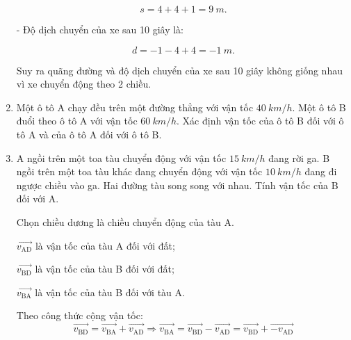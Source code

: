 \begin{enumerate}[label=\bfseries Câu \arabic*:]
{\begin{enumerate}[label=\alph*)]
			$$s = 4 + 4 + 1 = \SI{9}{m}.$$
			
			- Độ dịch chuyển của xe sau 10 giây là:
			
			$$d = - 1 - 4 + 4 = - \SI{1}{m}.$$
			
			Suy ra quãng đường và độ dịch chuyển của xe sau 10 giây không giống nhau vì xe chuyển động theo 2 chiều.
			
		\end{enumerate}
		
	}
			\item {}

{Một ô tô A chạy đều trên một đường thẳng với vận tốc $\SI{40}{km/h}$. Một ô tô B đuổi theo ô tô A với vận tốc $\SI{60}{km/h}$. Xác định vận tốc của ô tô B đối với ô tô A và của ô tô A đối với ô tô B.}
\item {}


{A ngồi trên một toa tàu chuyển động với vận tốc $\SI{15}{km/h}$ đang rời ga. B ngồi trên một toa tàu khác đang chuyển động với vận tốc $\SI{10}{km/h}$ đang đi ngược chiều vào ga. Hai đường tàu song song với nhau. Tính vận tốc của B đối với A.
}
\hideall
{Chọn chiều dương là chiều chuyển động của tàu A.
	
	$\overrightarrow{v_\text{AD}}$ là vận tốc của tàu A đối với đất;
	
	$\overrightarrow{v_\text{BD}}$ là vận tốc của tàu B đối với đất;
	
	$\overrightarrow{v_\text{BA}}$ là vận tốc của tàu B đối với tàu A.
	
	Theo công thức cộng vận tốc:
	$$\overrightarrow{v_\text{BD}} = \overrightarrow{v_\text{BA}}+\overrightarrow{v_\text{AD}} \Rightarrow \overrightarrow{v_\text{BA}} = \overrightarrow{v_\text{BD}} - \overrightarrow{v_\text{AD}}=\overrightarrow{v_\text{BD}} + \overrightarrow{-v_\text{AD}}$$
	
}
\end{enumerate}

